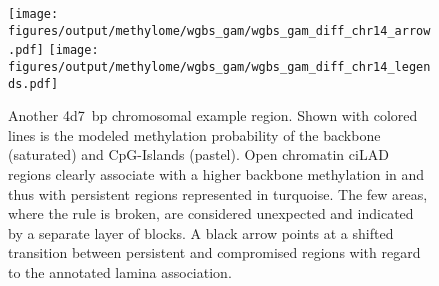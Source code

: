 \begin{figure}[!ht]
	\centering
	\texttt{[image: figures/output/methylome/wgbs\_gam/wgbs\_gam\_diff\_chr14\_arrow.pdf]}
	\texttt{[image: figures/output/methylome/wgbs\_gam/wgbs\_gam\_diff\_chr14\_legends.pdf]} 
	\caption{Another \SI{4d7}{bp} chromosomal example region. Shown with colored lines is the modeled methylation probability of the backbone (saturated) and CpG-Islands (pastel). Open chromatin ciLAD regions clearly associate with a higher backbone methylation in \dnmtchip \kitpos and thus with persistent regions represented in turquoise. The few areas, where the rule is broken, are considered unexpected and indicated by a separate layer of blocks. A black arrow points at a shifted transition between persistent and compromised regions with regard to the annotated lamina association.}
	\label{fig:wgbs_gam_diff_chr14}
\end{figure}



